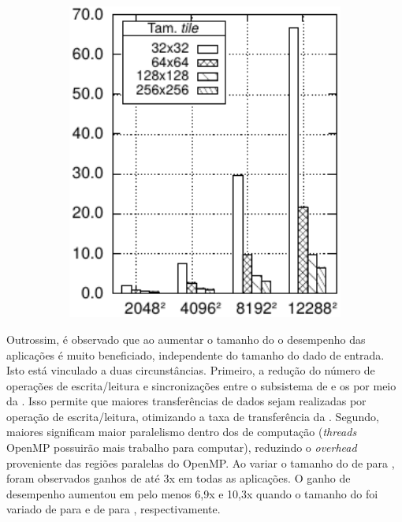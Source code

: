 \begin{figure}[H]
\begin{subfigure}{0.3\textwidth}
    \caption{\gol}
    \label{fig:tilesGol}
  \end{subfigure}
  \begin{subfigure}{0.3\textwidth}
    \centering
    \includegraphics[width=1\textwidth]{figs/MPPAPlotAPIjacobiTimeTiles.pdf}
    \caption{\jacobi}
    \label{fig:tilesJacobi}
  \end{subfigure}
  \label{fig:tiles}
\end{figure}

Outrossim, é observado que ao aumentar o tamanho do \tile o desempenho das aplicações é muito beneficiado, independente do tamanho do dado de entrada. Isto está vinculado a duas circunstâncias. Primeiro, a redução do número de operações de escrita/leitura e sincronizações entre o subsistema de \io e os \clusters por meio da \noc. Isso permite que maiores transferências de dados sejam realizadas por operação de escrita/leitura, otimizando a taxa de transferência da \noc. Segundo, maiores \tiles significam maior paralelismo dentro dos \clusters de computação (\ie \textit{threads} OpenMP possuirão mais trabalho para computar), reduzindo o \textit{overhead} proveniente das regiões paralelas do OpenMP. Ao variar o tamanho do \tile de \tilea para \tileb, foram observados ganhos de até 3x em todas as aplicações. O ganho de desempenho aumentou em pelo menos 6,9x e 10,3x quando o tamanho do \tile foi variado de \tilea para \tilec e de \tilea para \tiled, respectivamente.

